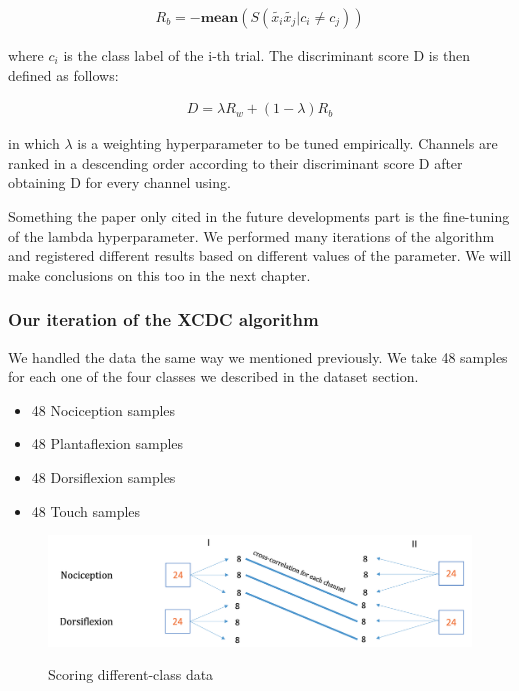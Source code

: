 \documentclass{Configuration_Files/PoliMi3i_thesis}
\begin{document}
\begin{align}
	R_b = -\mathbf{mean}(S(\tilde{x_i}\tilde{x_j}| c_i \neq  c_j))
   \label{eq:XCDC5}
\end{align}

where $c_i$ is the class label of the i-th trial. The discriminant score D is then defined as follows:

\begin{align}
	D = \lambda R_w + (1-\lambda)R_b
   \label{eq:XCDC6_2}
\end{align}

in which $\lambda$ is a weighting hyperparameter to be tuned empirically.
Channels are ranked in a descending order according to their discriminant score D after obtaining D for every channel using.

Something the paper only cited in the future developments part is the fine-tuning of the lambda hyperparameter.
We performed many iterations of the algorithm and registered different results based on different values of the parameter.
We will make conclusions on this too in the next chapter.

\subsubsection{Our iteration of the XCDC algorithm}

We handled the data the same way we mentioned previously.
We take 48 samples for each one of the four classes we described in the dataset section.

\begin{itemize}
	\item 48 Nociception samples
	\item 48 Plantaflexion samples
	\item 48 Dorsiflexion samples
	\item 48 Touch samples
\end{itemize}

\begin{figure}[H]
    \includegraphics[scale=0.25]{scoreDifferentClass.png}
    \centering
    \label{scoreDifferentClass}
    \caption{Scoring different-class data}
\end{figure}
\end{document}

